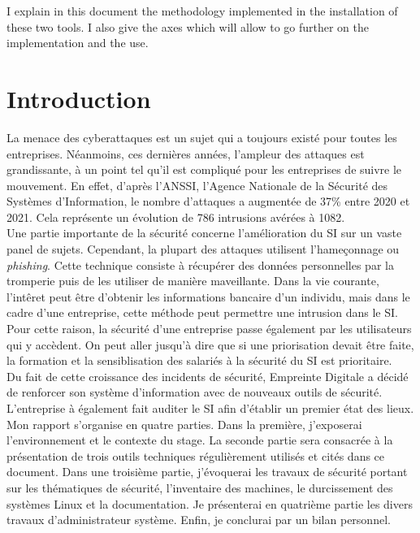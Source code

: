 \documentclass[12pt, a4paper, twoside]{article}
\begin{document}
I explain in this document the methodology implemented in the installation of these two tools.
I also give the axes which will allow to go further on the implementation and the use.

\newpage
\section*{Introduction}
La menace des cyberattaques est un sujet qui a toujours existé pour toutes les entreprises.
Néanmoins, ces dernières années, l'ampleur des attaques est grandissante, à un point tel qu'il est compliqué pour les entreprises de suivre le mouvement.
En effet, d'après l'\gls{ANSSI}, l'Agence Nationale de la Sécurité des Systèmes d'Information, le nombre d'attaques a augmentée de 37\% entre 2020 et 2021.
Cela représente un évolution de 786 intrusions avérées à 1082. \\

Une partie importante de la sécurité concerne l'amélioration du SI sur un vaste panel de sujets.
Cependant, la plupart des attaques utilisent l'hameçonnage ou \textit{phishing}.
Cette technique consiste à récupérer des données personnelles par la tromperie puis de les utiliser de manière maveillante.
Dans la vie courante, l'intêret peut être d'obtenir les informations bancaire d'un individu, mais dans le cadre d'une entreprise, cette méthode peut permettre une intrusion dans le \gls{SI}.
Pour cette raison, la sécurité d'une entreprise passe également par les utilisateurs qui y accèdent.
On peut aller jusqu'à dire que si une priorisation devait être faite, la formation et la sensiblisation des salariés à la sécurité du \gls{SI} est prioritaire.\\

Du fait de cette croissance des incidents de sécurité, Empreinte Digitale a décidé de renforcer son système d'information avec de nouveaux outils de sécurité.
L'entreprise à également fait auditer le \gls{SI} afin d'établir un premier état des lieux. \\

Mon rapport s'organise en quatre parties. 
Dans la première, j'exposerai l'environnement et le contexte du stage. 
La seconde partie sera consacrée à la présentation de trois outils techniques régulièrement utilisés et cités dans ce document. 
Dans une troisième partie, j'évoquerai les travaux de sécurité portant sur les thématiques de sécurité, l'inventaire des machines, le durcissement des systèmes \gls{Linux} et la documentation. 
Je présenterai en quatrième partie les divers travaux d'administrateur système. 
Enfin, je conclurai par un bilan personnel.\\
\end{document}
